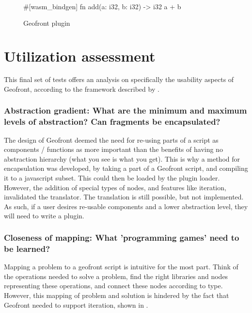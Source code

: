 \begin{figure}
\centering
\begin{code}
#[wasm_bindgen]
fn add(a: i32, b: i32) -> i32 {
    a + b
}
\end{code}
\caption[]{Geofront plugin}
\label{fig:boilerplate:geofront}
\end{figure}


\section{Utilization assessment}
\label{sec:testing:usability}

This final set of tests offers an analysis on specifically the usability aspects of Geofront, according to the framework described by \citet{green_usability_1996}.

\subsubsection*{Abstraction gradient: What are the minimum and maximum levels of abstraction? Can fragments be encapsulated?}
 
The design of Geofront deemed the need for re-using parts of a script as components / functions as more important than the benefits of having no abstraction hierarchy (what you see is what you get).
This is why a method for encapsulation was developed, by taking a part of a Geofront script, and compiling it to a javascript subset. This could then be loaded by the plugin loader. 
However, the addition of special types of nodes, and features like iteration, invalidated the  translator.
The translation is still possible, but not implemented.  
As such, if a user desires re-usable components and a lower abstraction level, they will need to write a plugin.


\subsubsection*{Closeness of mapping: What 'programming games' need to be learned?}

Mapping a problem to a geofront script is intuitive for the most part.
Think of the operations needed to solve a problem, 
find the right libraries and nodes representing these operations,
and connect these nodes according to type. 
However, this mapping of problem and solution is hindered by the fact that Geofront needed to support iteration, shown in . 

